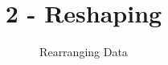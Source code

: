 \documentclass{beamer}
\title[2-Format]{2 - Reshaping}
\subtitle{Rearranging Data}
\date{\hspace{1in}}
\institute[ISU]{Iowa State University}
\begin{document}
\begin{frame}
\maketitle
\end{frame}
\end{document}

